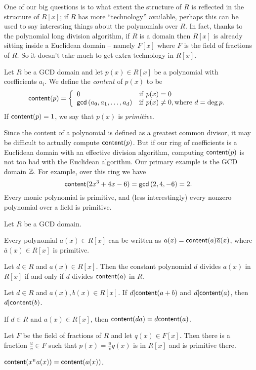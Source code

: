 One of our big questions is to what extent the structure of \(R\) is reflected in the structure of \(R[x]\); if \(R\) has more ``technology'' available, perhaps this can be used to say interesting things about the polynomials over \(R\). In fact, thanks to the polynomial long division algorithm, if \(R\) is a domain then \(R[x]\) is already sitting inside a Euclidean domain -- namely \(F[x]\) where \(F\) is the field of fractions of \(R\). So it doesn't take much to get extra technology in \(R[x]\).

\begin{dfn} \label{dfn:poly-content}
Let \(R\) be a GCD domain and let \(p(x) \in R[x]\) be a polynomial with coefficients \(a_i\). We define the \emph{content} of \(p(x)\) to be \[ \mathsf{content}(p) = \left\{ \begin{array}{ll} 0 & \mathrm{if}\ p(x) = 0 \\ \mathsf{gcd}\left(a_0,a_1,\ldots,a_d\right) & \mathrm{if}\ p(x) \neq 0, \mathrm{where}\ d = \deg{p}. \end{array} \right. \] If \(\mathsf{content}(p) = 1\), we say that \(p(x)\) is \emph{primitive}.  
\end{dfn}

Since the content of a polynomial is defined as a greatest common divisor, it may be difficult to actually compute \(\mathsf{content}(p)\). But if our ring of coefficients is a Euclidean domain with an effective division algorithm, computing \(\mathsf{content}(p)\) is not too bad with the Euclidean algorithm. Our primary example is the GCD domain \(\mathbb{Z}\). For example, over this ring we have \[ \mathsf{content}(2x^3 + 4x - 6) = \mathsf{gcd}\left(2,4,-6\right) = 2. \] Every monic polynomial is primitive, and (less interestingly) every nonzero polynomial over a field is primitive.

\begin{prop} \label{prop:content-basics}
Let \(R\) be a GCD domain.
\begin{proplist}
\item Every polynomial \(a(x) \in R[x]\) can be written as \(a(x) = \mathsf{content}(a) \overline{a}(x)\), where \(\overline{a}(x) \in R[x]\) is primitive.
\item Let \(d \in R\) and \(a(x) \in R[x]\). Then the constant polynomial \(d\) divides \(a(x)\) in \(R[x]\) if and only if \(d\) divides \(\mathsf{content}(a)\) in \(R\).
\item Let \(d \in R\) and \(a(x), b(x) \in R[x]\). If \(d|\mathsf{content}(a+b)\) and \(d|\mathsf{content}(a)\), then \(d|\mathsf{content}(b)\).
\item If \(d \in R\) and \(a(x) \in R[x]\), then \(\mathsf{content}(da) = d\mathsf{content}(a)\).
\item Let \(F\) be the field of fractions of \(R\) and let \(q(x) \in F[x]\). Then there is a fraction \(\frac{u}{v} \in F\) such that \(p(x) = \frac{u}{v}q(x)\) is in \(R[x]\) and is primitive there.
\item \(\mathsf{content}(x^n a(x)) = \mathsf{content}(a(x))\).
\end{proplist}
\end{prop}

